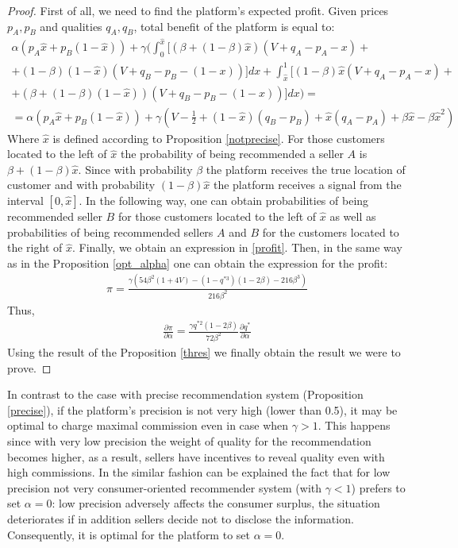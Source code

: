 \documentclass[a4paper]{article}
\begin{document}
\begin{proof}
 First of all, we need to find the platform's expected profit. Given prices $p_A, p_B$ and qualities $q_A, q_B$, total benefit of the platform is equal to:
 \begin{align}\label{profit}
 \alpha(p_A \hat{x} + p_B(1-\hat{x})) + \gamma \biggl(\int_{0}^{\hat{x}} \biggl[ (\beta +(1-\beta)\hat{x})(V + q_A - p_A - x) + \nonumber \\+ (1-\beta)(1-\hat{x})(V + q_B - p_B - (1-x))\biggr]dx + \int_{\hat{x}}^1 \biggl[(1-\beta) \hat{x}(V+q_A-p_A-x) + \nonumber\\
 +(\beta + (1-\beta)(1-\hat{x}))(V + q_B - p_B -(1-x)) \biggr] dx\biggr) = \\
 = 	\alpha(p_A \hat{x} + p_B(1-\hat{x})) + \gamma \left(V - \frac{1}{2}+(1-\hat{x})(q_B - p_B) + \hat{x}(q_A-p_A) + \beta \hat{x} - \beta \hat{x}^2  \right)\nonumber
 \end{align}
 Where $\hat{x}$ is defined according to Proposition \ref{notprecise}. For those customers located to the left of $\hat{x}$ the probability of being recommended a seller $A$ is $\beta + (1-\beta) \hat{x}$. Since with probability $\beta$ the platform receives the true location of customer and with probability $(1-\beta) \hat{x}$ the platform receives a signal from the interval $[0, \hat{x}]$. In the following way, one can obtain probabilities of being recommended seller $B$ for those customers located to the left of $\hat{x}$ as well as probabilities of being recommended sellers $A$ and $B$ for the customers located to the right of $\hat{x}$. Finally, we obtain an expression in \eqref{profit}. Then, in the same way as in the Proposition \ref{opt_alpha} one can obtain the expression for the profit:
 \begin{align}\label{profit_b}
 \pi = \frac{\gamma(54 \beta^2(1+4V) - (1-q^{*3})(1-2\beta) - 216 \beta^3)}{216 \beta^2}
 \end{align}
 Thus, \begin{align*}
 \frac{\partial \pi }{\partial \alpha} = \frac{\gamma q^{*2}(1-2\beta)}{72 \beta^2} \frac{\partial q^*}{\partial \alpha}
 \end{align*}
 Using the result of the Proposition \ref{thres} we finally obtain the result we were to prove.
\end{proof}
In contrast to the case with precise recommendation system (Proposition \ref{precise}), if the platform's precision is not very high (lower than 0.5), it may be optimal to charge maximal commission even in case when $\gamma > 1$. This happens since with very low precision the weight of quality for the recommendation becomes higher, as a result, sellers have incentives to reveal quality even with high commissions. In the similar fashion can be explained the fact that for low precision not very consumer-oriented recommender system (with $\gamma < 1$) prefers to set $\alpha = 0$: low precision adversely affects the consumer surplus, the situation deteriorates if in addition sellers decide not to disclose the information. Consequently, it is optimal for the platform to set $\alpha = 0$.
\end{document}
